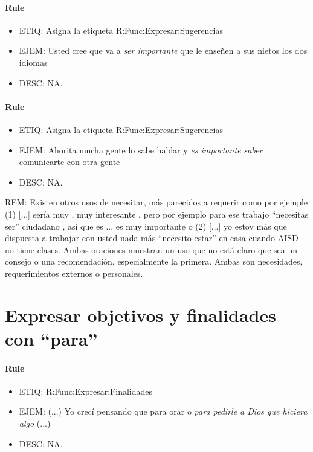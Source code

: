 \documentclass[11pt]{report}
\begin{document}
\paragraph*{Rule}
\begin{itemize}
\item ETIQ: Asigna la etiqueta R:Func:Expresar:Sugerencias
\item EJEM: Usted cree que va a \emph{ser importante} que le enseñen a sus nietos los dos idiomas 
\item DESC: NA.
\end{itemize}

\paragraph*{Rule}
\begin{itemize}
\item ETIQ: Asigna la etiqueta R:Func:Expresar:Sugerencias
\item EJEM: Ahorita mucha gente lo sabe hablar y \emph{es importante saber} comunicarte con otra gente
\item DESC: NA.
\end{itemize}

REM: Existen otros usos de necesitar, más parecidos a requerir como por ejemple (1)  [...] sería muy , muy interesante , pero por ejemplo para ese trabajo ``necesitas ser'' ciudadano , así que es ... es muy importante o (2) [...] yo estoy más que dispuesta a trabajar con usted nada más ``necesito estar'' en casa cuando AISD no tiene clases. Ambas oraciones muestran un uso que no está claro que sea un consejo o una recomendación, especialmente la primera. Ambas son necesidades, requerimientos externos o personales.
\section{Expresar objetivos y finalidades con ``para''}
\paragraph*{Rule}
\begin{itemize}
\item ETIQ: R:Func:Expresar:Finalidades
\item EJEM: (...) Yo crecí pensando que para orar o \emph{para pedirle a Dios que hiciera algo} (...)
\item DESC: NA.
\end{itemize}
\end{document}
